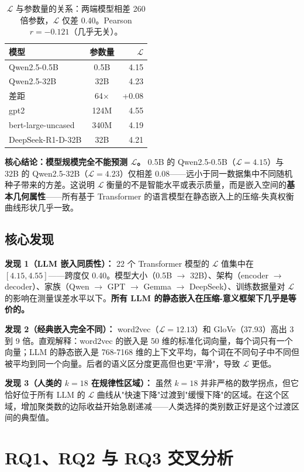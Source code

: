 \documentclass[11pt,a4paper]{article}
\begin{document}
\begin{table}[H]\centering
\begin{tabular}{lcr}
\toprule
\textbf{模型} & \textbf{参数量} & $\mathcal{L}$\\
\midrule
Qwen2.5-0.5B & 0.5B & 4.15\\
Qwen2.5-32B & 32B & 4.23\\
\quad 差距 & 64$\times$ & +0.08\\
\midrule
gpt2 & 124M & 4.55\\
bert-large-uncased & 340M & 4.19\\
DeepSeek-R1-D-32B & 32B & 4.21\\
\bottomrule
\end{tabular}
\caption{$\mathcal{L}$ 与参数量的关系：两端模型相差 260 倍参数，$\mathcal{L}$ 仅差 0.40。Pearson $r = -0.121$（几乎无关）。}
\end{table}

\textbf{核心结论：模型规模完全不能预测 $\mathcal{L}$。} 0.5B 的 Qwen2.5-0.5B（$\mathcal{L}=4.15$）与 32B 的 Qwen2.5-32B（$\mathcal{L}=4.23$）仅相差 0.08——远小于同一数据集中不同随机种子带来的方差。这说明 $\mathcal{L}$ 衡量的不是智能水平或表示质量，而是嵌入空间的\textbf{基本几何属性}——所有基于 Transformer 的语言模型在静态嵌入上的压缩-失真权衡曲线形状几乎一致。

\subsection{核心发现}

\textbf{发现 1（LLM 嵌入同质性）：} 22 个 Transformer 模型的 $\mathcal{L}$ 值集中在 $[4.15, 4.55]$——跨度仅 0.40。模型大小（0.5B $\to$ 32B）、架构（encoder $\to$ decoder）、家族（Qwen $\to$ GPT $\to$ Gemma $\to$ DeepSeek）、训练数据量对 $\mathcal{L}$ 的影响在测量误差水平以下。\textbf{所有 LLM 的静态嵌入在压缩-意义框架下几乎是等价的。}

\textbf{发现 2（经典嵌入完全不同）：} word2vec（$\mathcal{L}=12.13$）和 GloVe（37.93）高出 3 到 9 倍。直观解释：word2vec 的嵌入是 50 维的标准化词向量，每个词只有一个向量；LLM 的静态嵌入是 768-7168 维的上下文平均，每个词在不同句子中不同但被平均到同一个向量。后者的语义区分度更高但也更"平滑"，导致 $\mathcal{L}$ 更低。

\textbf{发现 3（人类的 $k=18$ 在规律性区域）：} 虽然 $k=18$ 并非严格的数学拐点，但它恰好位于所有 LLM 的 $\mathcal{L}$ 曲线从"快速下降"过渡到"缓慢下降"的区域。在这个区域，增加聚类数的边际收益开始急剧递减——人类选择的类别数正好是这个过渡区间的典型值。

\section{RQ1、RQ2 与 RQ3 交叉分析}
\end{document}
